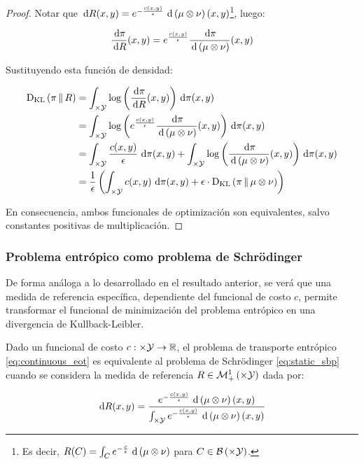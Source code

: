\begin{proof}
	Notar que $\,\operatorname{d}\! R(x,y) = e^{-\frac{c(x,y)}{\epsilon}}\,\operatorname{d}\!\,\left(\mu\otimes\nu\right)(x,y)$\footnote{Es decir, $R(C)=\int_{C} e^{-\frac{c}{\epsilon}}\,\operatorname{d}\!\,\left(\mu\otimes\nu\right)$ para $C\in\borel{\xspace\times\yspace}$.}, luego:

	\begin{equation*}
		\frac{\,\operatorname{d}\!\pi}{\,\operatorname{d}\! R}(x,y) = e^{\frac{c(x,y)}{\epsilon}} \frac{\,\operatorname{d}\!\pi}{\,\operatorname{d}\!\,\left(\mu\otimes\nu\right)}(x,y) 
	\end{equation*}

	Sustituyendo esta función de densidad:

	\begin{align*}
		\KL{\pi}{R} &= \int_{\xspace\times\yspace} \log\parent{\frac{\d\pi}{\d R}(x,y)} \d\pi(x,y)\\
		&= \int_{\xspace\times\yspace} \log\parent{e^{\frac{c(x,y)}{\epsilon}}\frac{\d\pi}{\d\,\parent{\mu\otimes\nu}}(x,y)} \d\pi(x,y)\\
		&= \int_{\xspace\times\yspace} \frac{c(x,y)}{\epsilon} \d\pi(x,y) + \int_{\xspace\times\yspace} \log\parent{\frac{\d\pi}{\d\,\parent{\mu\otimes\nu}}(x,y)} \d\pi(x,y)\\
		&= \frac{1}{\epsilon}\parent{\int_{\xspace\times\yspace} c(x,y) \d\pi(x,y) + \epsilon\cdot\KL{\pi}{\mu\otimes\nu}}
	\end{align*}

	En consecuencia, ambos funcionales de optimización son equivalentes, salvo constantes positivas de multiplicación.

\end{proof}

\subsubsection{Problema entrópico como problema de Schrödinger}

De forma análoga a lo desarrollado en el resultado anterior, se verá que una medida de referencia específica, dependiente del funcional de costo $c$, permite transformar el funcional de minimización del problema entrópico en una divergencia de Kullback-Leibler.

\begin{prop}
	Dado un funcional de costo $c:\times\mathcal{Y}\to\mathbb{R}$, el problema de transporte entrópico \eqref{eq:continuous_eot} es equivalente al problema de Schrödinger \eqref{eq:static_sbp} cuando se considera la medida de referencia $R\in\probmeasure{\xspace\times\yspace}$ dada por:

	\begin{equation*}
		\,\operatorname{d}\! R(x,y) = \frac{e^{-\frac{c(x,y)}{\epsilon}}\,\operatorname{d}\!\,\left(\mu\otimes\nu\right)(x,y)}{\int_{\times\mathcal{Y}} e^{-\frac{c(x,y)}{\epsilon}}\,\operatorname{d}\!\,\left(\mu\otimes\nu\right)(x,y)}
	\end{equation*}

\end{prop}

